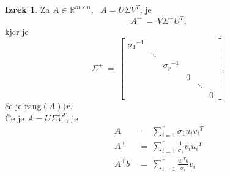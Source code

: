 \documentclass[11pt]{article}
\theoremstyle{definition}
\newtheorem{izrek}{Izrek}
\begin{document}
\begin{izrek}

Za $A \in \mathbb{R}^{m \times n}$, ~$A = U \Sigma V^T$, je
$$A^+ ~=~ V \Sigma^+ U^T,$$
kjer je
$$\Sigma^+ ~=~ \begin{bmatrix}
{\sigma_1}^{-1} & ~ & ~ & ~ & ~ & ~ \\
~ & \ddots & ~ & ~ & ~ & ~ \\
~ & ~ & {\sigma_r}^{-1} & ~ & ~ & ~ \\
~ & ~ & ~ & 0 & ~ & ~ \\
~ & ~ & ~ & ~ & \ddots & \\
~ & ~ & ~ & ~ & ~ & 0
\end{bmatrix},$$
če je $\text{rang}(A) ) r$. \\

\noindent Če je $A = U \Sigma V^T$, je 
\begin{align*}
A ~&=~ \sum_{i=1}^r \sigma_1 u_i {v_i}^T \\ 
A^+ ~&=~ \sum_{i=1}^r \frac{1}{\sigma_1} v_i {u_i}^T \\
A^+ b ~&=~ \sum_{i=1}^r \frac{{u_i}^T b}{\sigma_i} v_i
\end{align*}

\end{izrek}
\vspace{0.5cm}


\pagebreak

\end{document}
